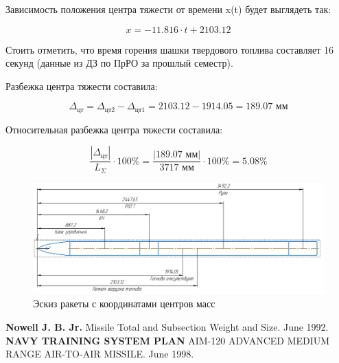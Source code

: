 \documentclass[a4paper,12pt]{report}
\begin{document}
\newpage
Зависимость положения центра тяжести от времени x(t) будет выглядеть так: 

\[x = -11.816\cdot t + 2103.12 \]

Стоить отметить, что время горения шашки твердового топлива составляет 16 секунд (данные из ДЗ по ПрРО за прошлый семестр).

Разбежка центра тяжести составила:

\[ \varDelta_{\text{цт}} = \varDelta_{\text{цт2}} - \varDelta_{\text{цт1}} = 2103.12 - 1914.05 = 189.07{\text{ мм}} \]

Относительная разбежка центра тяжести составила:

\[
\frac{|\varDelta_{\text{цт}}|}{L_{\varSigma}} \cdot 100\% = \frac{|189.07{\text{ мм}}|}{3717{\text{ мм}}} \cdot 100\% = 5.08\%
\]

\begin{figure}[h]
\centering
\includegraphics[width=0.65\textheight]{images/7.jpg}
\caption{Эскиз ракеты с координатами центров масс}
\label{AIM-120}
\end{figure}

\newpage
\begin{thebibliography}{9}
\bibitem{} \textbf{Nowell J. B. Jr.} Missile Total and Subsection Weight and Size. June 1992.
\bibitem{} \textbf{NAVY TRAINING SYSTEM PLAN} AIM-120 ADVANCED MEDIUM RANGE
 AIR-TO-AIR MISSILE. June 1998.

\end{thebibliography}
\end{document}
